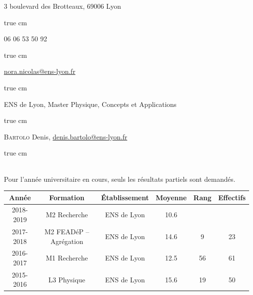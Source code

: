 \documentclass[11pt,a4]{article}
\begin{document}

 3 boulevard des Brotteaux, 69006 Lyon

 true cm

 06 06 53 50 92

 true cm

 \href{mailto:nora.nicolas@ens-lyon.fr}{nora.nicolas@ens-lyon.fr}

 true cm

 ENS de Lyon, Master Physique, Concepts et Applications

 true cm

\textsc{Bartolo} Denis, \href{mailto:denis.bartolo@ens-lyon.fr}{denis.bartolo@ens-lyon.fr}

 true cm

 \\ Pour l'année universitaire en cours, seuls les résultats partiels sont demandés.

\begin{center}
    \begin{tabular}{|c|c|c|c|c|c|} \cline{1-6}
        Année     & Formation               & Établissement & Moyenne & Rang & Effectifs \\ \hline
        2018-2019 & M2 Recherche            & ENS de Lyon   & 10.6    &      & \\ \hline
        2017-2018 & M2 FEADéP -- Agrégation & ENS de Lyon   & 14.6    & 9    & 23 \\ \hline
        2016-2017 & M1 Recherche            & ENS de Lyon   & 12.5    & 56   & 61\\ \hline
        2015-2016 & L3 Physique             & ENS de Lyon   & 15.6    & 19   & 50\\ \hline
    \end{tabular}
\end{center}

\newpage
{} \\ 
\end{document}
